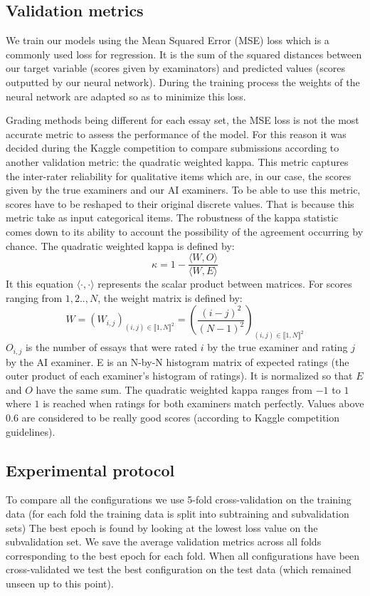 \documentclass[a4paper,12pt,english]{article}
\begin{document}
\subsection{Validation metrics}
\label{validation}

We train our models using the Mean Squared Error (MSE) loss which is a commonly used loss for regression. It is the sum of the squared distances between our target variable (scores given by examinators) and predicted values (scores outputted by our neural network). During the training process the weights of the neural network are adapted so as to minimize this loss.

Grading methods being different for each essay set, the MSE loss is not the most accurate metric to assess the performance of the model. For this reason it was decided during the Kaggle competition to compare submissions according to another validation metric: the quadratic weighted kappa. This metric captures the inter-rater reliability for qualitative items which are, in our case, the scores given by the true examiners and our AI examiners. To be able to use this metric, scores have to be reshaped to their original discrete values. That is because this metric take as input categorical items. The robustness of the kappa statistic comes down to its ability to account the possibility of the agreement occurring by chance. The quadratic weighted kappa is defined by:
\begin{equation}
\kappa = 1 - \frac{\langle{W},{O}\rangle}{\langle{W},{E}\rangle}
\end{equation}
It this equation $\langle\cdot,\cdot\rangle$ represents the scalar product between matrices. For scores ranging from $1,2..,N$, the weight matrix is defined by:
\begin{equation}
W = (W_{i, j})_{(i,j) \in \llbracket 1, N \rrbracket^2}=\left(\frac{(i-j)^2}{(N-1)^2}\right)_{(i,j) \in \llbracket 1, N \rrbracket^2}
\end{equation}
$O_{i, j}$ is the number of essays that were rated $i$ by the true examiner and rating $j$ by the AI examiner.
E is an N-by-N histogram matrix of expected ratings (the outer product of each examiner's histogram of ratings). It is normalized so that $E$ and $O$ have the same sum.
The quadratic weighted kappa ranges from $-1$ to $1$ where $1$ is reached when ratings for both examiners match perfectly. Values above $0.6$ are considered to be really good scores (according to Kaggle competition guidelines).

\subsection{Experimental protocol}
To compare all the configurations we use 5-fold cross-validation on the training data (for each fold the training data is split into subtraining and subvalidation sets)
The best epoch is found by looking at the lowest loss value on the subvalidation set.
We save the average validation metrics across all folds corresponding to the best epoch for each fold.
When all configurations have been cross-validated we test the best configuration on the test data (which remained unseen up to this point).
\end{document}
